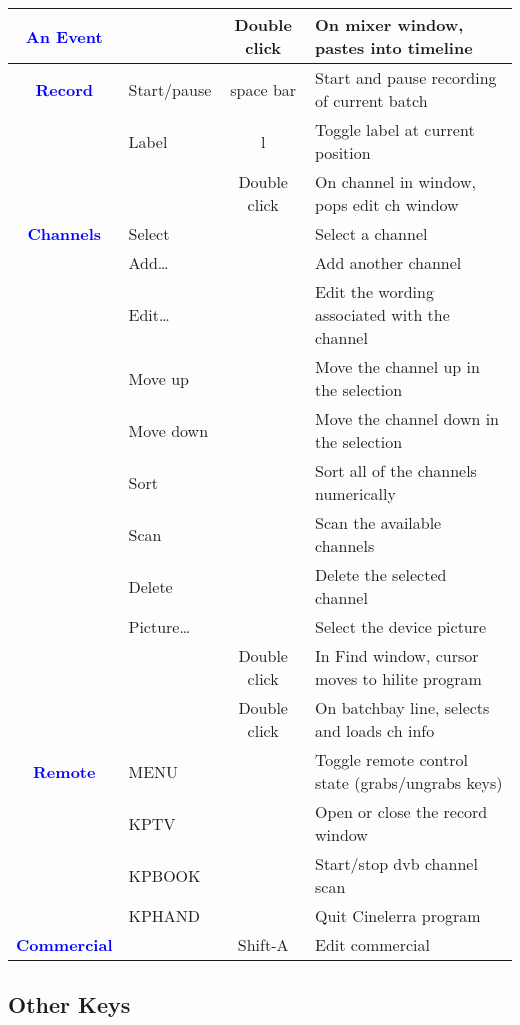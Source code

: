 \begin{center}
\begin{longtable}{ >{\bfseries}c l c p{6cm}}
        \textcolor{blue}{An Event} &  & Double click & On mixer window, pastes into timeline \\
        \midrule
        \textcolor{blue}{Record} & Start/pause & space bar & Start and pause recording of current batch \\        
        & Label & l & Toggle label at current position \\        
        &  & Double click & On channel in window, pops edit ch window \\
        \midrule
        \textcolor{blue}{Channels} & Select &  & Select a channel \\        
        & Add\dots &  & Add another channel \\        
        & Edit\dots &  & Edit the wording associated with the channel \\        
        & Move up &  & Move the channel up in the selection \\        
        & Move down &  & Move the channel down in the selection \\        
        & Sort &  & Sort all of the channels numerically \\        
        & Scan &  & Scan the available channels \\        
        & Delete &  & Delete the selected channel \\        
        & Picture\dots &  & Select the device picture \\        
        &  & Double click & In Find window, cursor moves to hilite program \\        
        &  & Double click & On batchbay line, selects and loads ch info \\
        \midrule
        \textcolor{blue}{Remote} & MENU &  & Toggle remote control state (grabs/ungrabs keys) \\        
        & KPTV &  & Open or close the record window \\        
        & KPBOOK &  & Start/stop dvb channel scan \\        
        & KPHAND &  & Quit Cinelerra program \\
        \midrule
        \textcolor{blue}{Commercial} &  & Shift-A & Edit commercial\\        
                
        \bottomrule  
    \end{longtable}
\end{center}

\subsection{Other Keys }%
\label{ssec:other_keys}

